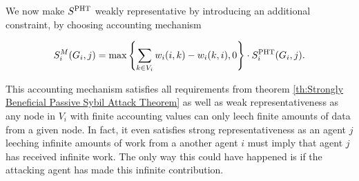 \begin{example}[]
\noindent{}We now make $S^{\rm PHT}$ weakly representative by introducing an additional constraint, by choosing accounting mechanism

\[
S^M_i(G_i,j) = \max\left\lbrace\sum\limits_{k\in{}V_i}w_i(i,k)-w_i(k,i), 0\right\rbrace\cdot{}S^{\rm PHT}_i(G_i,j).
\]

\noindent{}This accounting mechanism satisfies all requirements from theorem \ref{th:Strongly Beneficial Passive Sybil Attack Theorem} as well as weak representativeness as any node in $V_i$ with finite accounting values can only leech finite amounts of data from a given node. In fact, it even satisfies strong representativeness as an agent $j$ leeching infinite amounts of work from a another agent $i$ must imply that agent $j$ has received infinite work. The only way this could have happened is if the attacking agent has made this infinite contribution. \vspace{1em}\\

\end{example}
